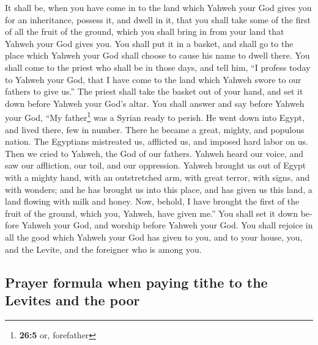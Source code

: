 \begin{paracol}{2}
\begin{otherlanguage}{english}
 It shall be, when you have come in to the land which
Yahweh your God gives you for an inheritance, possess it, and dwell in
it,  that you shall take some of the first of all the
fruit of the ground, which you shall bring in from your land that Yahweh
your God gives you. You shall put it in a basket, and shall go to the
place which Yahweh your God shall choose to cause his name to dwell
there.  You shall come to the priest who shall be in those
days, and tell him, ``I profess today to Yahweh your God, that I have
come to the land which Yahweh swore to our fathers to give us.''
 The priest shall take the basket out of your hand, and
set it down before Yahweh your God's altar.  You shall
answer and say before Yahweh your God, ``My father\footnote{\textbf{26:5}
  or, forefather} was a Syrian ready to perish. He went down into Egypt,
and lived there, few in number. There he became a great, mighty, and
populous nation.  The Egyptians mistreated us, afflicted
us, and imposed hard labor on us.  Then we cried to
Yahweh, the God of our fathers. Yahweh heard our voice, and saw our
affliction, our toil, and our oppression.  Yahweh brought
us out of Egypt with a mighty hand, with an outstretched arm, with great
terror, with signs, and with wonders;  and he has brought
us into this place, and has given us this land, a land flowing with milk
and honey.  Now, behold, I have brought the first of the
fruit of the ground, which you, Yahweh, have given me.'' You shall set
it down before Yahweh your God, and worship before Yahweh your God.
 You shall rejoice in all the good which Yahweh your God
has given to you, and to your house, you, and the Levite, and the
foreigner who is among you.

\hypertarget{prayer-formula-when-paying-tithe-to-the-levites-and-the-poor}{%
\subsection{Prayer formula when paying tithe to the Levites and the
poor}\label{prayer-formula-when-paying-tithe-to-the-levites-and-the-poor}}


\end{otherlanguage}
\end{paracol}
